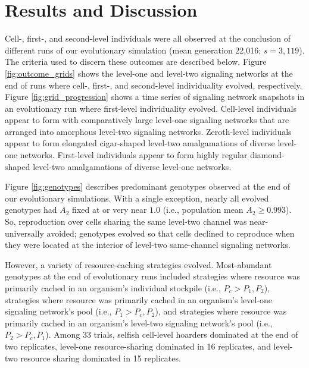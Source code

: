 \section{Results and Discussion}







Cell-, first-, and second-level individuals were all observed at the conclusion of different runs of our evolutionary simulation (mean generation 22,016; $s=3,119$).
The criteria used to discern these outcomes are described below.
Figure \ref{fig:outcome_grids} shows the level-one and level-two signaling networks at the end of runs where cell-, first-, and second-level individuality evolved, respectively.
Figure \ref{fig:grid_progression} shows a time series of signaling network snapshots in an evolutionary run where first-level individuality evolved.
Cell-level individuals appear to form with comparatively large level-one signaling networks that are arranged into amorphous level-two signaling networks.
Zeroth-level individuals appear to form elongated cigar-shaped level-two amalgamations of diverse level-one networks.
First-level individuals appear to form highly regular diamond-shaped level-two amalgamations of diverse level-one networks.

Figure \ref{fig:genotypes} describes predominant genotypes observed at the end of our evolutionary simulations.
With a single exception, nearly all evolved genotypes had $A_2$ fixed at or very near $1.0$ (i.e., population mean $A_2 \geq 0.993$).
So, reproduction over cells sharing the same level-two channel was near-universally avoided;
genotypes evolved so that cells declined to reproduce when they were located at the interior of level-two same-channel signaling networks.

However, a variety of resource-caching strategies evolved.
Most-abundant genotypes at the end of evolutionary runs included strategies where resource was primarily cached in an organism's individual stockpile (i.e., $P_{c} > P_1, P_2$), strategies where resource was primarily cached in an organism's level-one signaling network's pool (i.e., $P_1 > P_{c}, P_2$), and strategies where resource was primarily cached in an organism's level-two signaling network's pool (i.e., $P_2 > P_{c}, P_1$).
Among 33 trials, selfish cell-level hoarders dominated at the end of two replicates, level-one resource-sharing dominated in 16 replicates, and level-two resource sharing dominated in 15 replicates.

